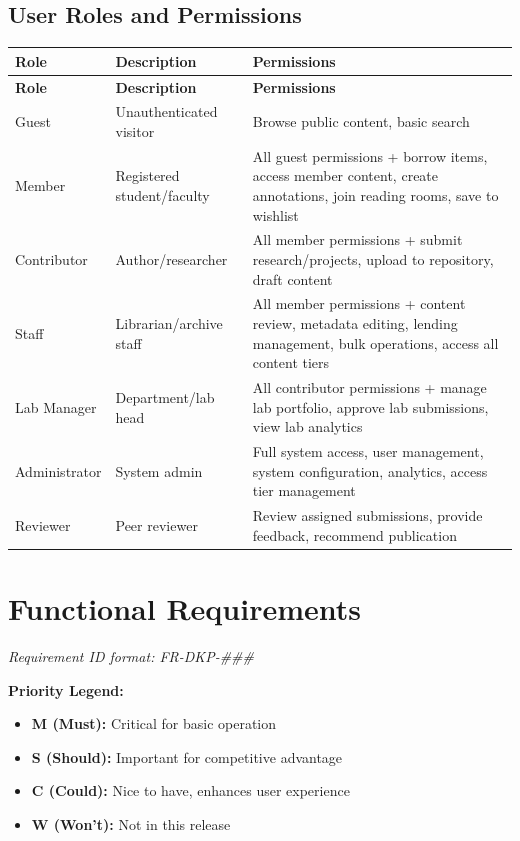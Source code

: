 \documentclass[12pt,a4paper]{report}
\begin{document}
\section{User Roles and Permissions}
\begin{longtable}{|p{3cm}|p{5cm}|p{6cm}|}
\hline
\textbf{Role} & \textbf{Description} & \textbf{Permissions} \\ \hline
\endfirsthead
\hline
\textbf{Role} & \textbf{Description} & \textbf{Permissions} \\ \hline
\endhead
Guest & Unauthenticated visitor & Browse public content, basic search \\ \hline
Member & Registered student/faculty & All guest permissions + borrow items, access member content, create annotations, join reading rooms, save to wishlist \\ \hline
Contributor & Author/researcher & All member permissions + submit research/projects, upload to repository, draft content \\ \hline
Staff & Librarian/archive staff & All member permissions + content review, metadata editing, lending management, bulk operations, access all content tiers \\ \hline
Lab Manager & Department/lab head & All contributor permissions + manage lab portfolio, approve lab submissions, view lab analytics \\ \hline
Administrator & System admin & Full system access, user management, system configuration, analytics, access tier management \\ \hline
Reviewer & Peer reviewer & Review assigned submissions, provide feedback, recommend publication \\ \hline
\end{longtable}

\chapter{Functional Requirements}

\textit{Requirement ID format: FR-DKP-\#\#\#}

\textbf{Priority Legend:}
\begin{itemize}
    \item \textbf{M (Must):} Critical for basic operation
    \item \textbf{S (Should):} Important for competitive advantage
    \item \textbf{C (Could):} Nice to have, enhances user experience
    \item \textbf{W (Won't):} Not in this release
\end{itemize}
\end{document}
